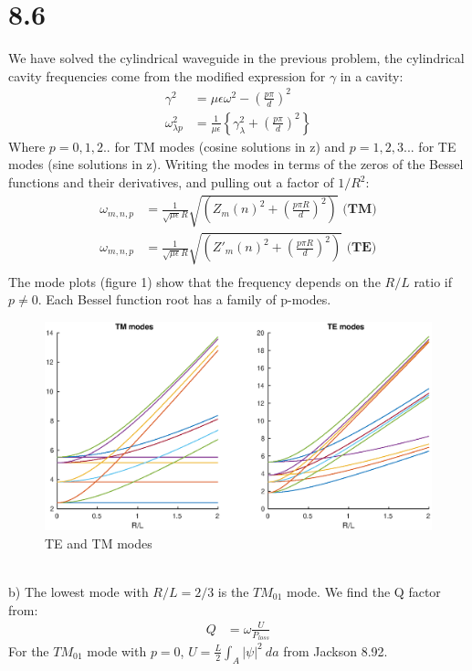 \documentclass[a4paper,11pt]{article}
\numberwithin{equation}{section}
\newcommand{\lrp}[1]{\left({#1}\right)}
\newcommand{\lrb}[1]{\left\{{#1}\right\}}
\begin{document}
\section*{8.6}
We have solved the cylindrical waveguide in the previous problem, the cylindrical cavity frequencies come from the modified expression for $\gamma$ in a cavity:
\begin{align}
 \gamma^2 &= \mu\epsilon\omega^2 - \lrp{\frac{p\pi}{d}}^2\\
 \omega^2_{\lambda p} &= \frac{1}{\mu\epsilon}\lrb{\gamma_\lambda^2+\lrp{\frac{p\pi}{d}}^2}
\end{align}
Where $p=0,1,2..$ for TM modes (cosine solutions in z) and $p=1,2,3...$ for TE modes (sine solutions in z).
Writing the modes in terms of the zeros of the Bessel functions and their derivatives, and pulling out a factor of $1/R^2$:
\begin{align}
 \omega_{m,n,p} &= \frac{1}{\sqrt{\mu\epsilon}R}\sqrt{\lrp{Z_m(n)^2+\lrp{\frac{p\pi R}{d}}^2}}\textbf{ (TM)}\\
 \omega_{m,n,p} &= \frac{1}{\sqrt{\mu\epsilon}R}\sqrt{\lrp{Z'_m(n)^2+\lrp{\frac{p\pi R}{d}}^2}}\textbf{ (TE)}\\
\end{align}
The mode plots (figure 1) show that the frequency depends on the $R/L$ ratio if $p \ne 0 $.
Each Bessel function root has a family of p-modes.
\begin{figure}[p]
 \caption{TE and TM modes}
 \centering
   \includegraphics[width=\textwidth]{p8_6}
\end{figure}
\\
b) The lowest mode with $R/L = 2/3$ is the $TM_{01}$ mode.
We find the Q factor from:
\begin{align}
 Q &= \omega \frac{U}{P_{loss}}
\end{align}
For the $TM_{01}$ mode with $p=0$, $U=\frac{L}{2}\int_A |\psi|^2\ da$ from Jackson 8.92.
\end{document}
